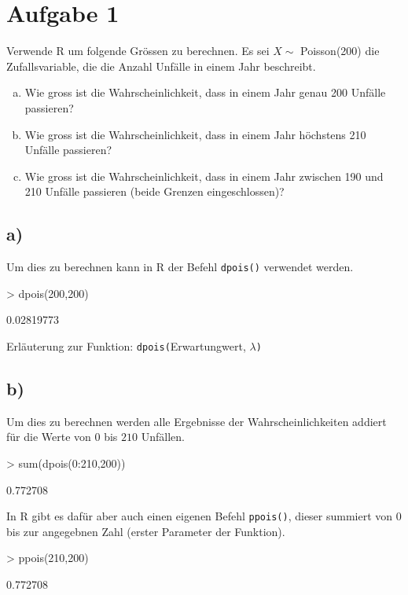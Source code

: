 \section{Aufgabe 1}
Verwende R um folgende Grössen zu berechnen. Es sei $X \sim$ Poisson(200) die
Zufallsvariable, die die Anzahl Unfälle in einem Jahr beschreibt.

\begin{enumerate}[(a)]
	\item Wie gross ist die Wahrscheinlichkeit, dass in einem Jahr genau
          200 Unfälle passieren?
	\item Wie gross ist die Wahrscheinlichkeit, dass in einem Jahr höchstens
          210 Unfälle passieren?
    \item Wie gross ist die Wahrscheinlichkeit, dass in einem Jahr zwischen
          190 und 210 Unfälle passieren (beide Grenzen eingeschlossen)?
\end{enumerate}

\subsection*{a)}
Um dies zu berechnen kann in R der Befehl \verb!dpois()! verwendet werden.
\begin{Schunk}
\begin{Sinput}
> dpois(200,200)
\end{Sinput}
\begin{Soutput}
[1] 0.02819773
\end{Soutput}
\end{Schunk}
Erläuterung zur Funktion: \verb!dpois(!Erwartungwert, $\lambda$\verb!)!

\subsection*{b)}
Um dies zu berechnen werden alle Ergebnisse der Wahrscheinlichkeiten addiert
für die Werte von $0$ bis $210$ Unfällen.
\begin{Schunk}
\begin{Sinput}
> sum(dpois(0:210,200))
\end{Sinput}
\begin{Soutput}
[1] 0.772708
\end{Soutput}
\end{Schunk}
In R gibt es dafür aber auch einen eigenen Befehl \verb!ppois()!, dieser
summiert von $0$ bis zur angegebnen Zahl (erster Parameter der Funktion).
\begin{Schunk}
\begin{Sinput}
> ppois(210,200)
\end{Sinput}
\begin{Soutput}
[1] 0.772708
\end{Soutput}
\end{Schunk}

